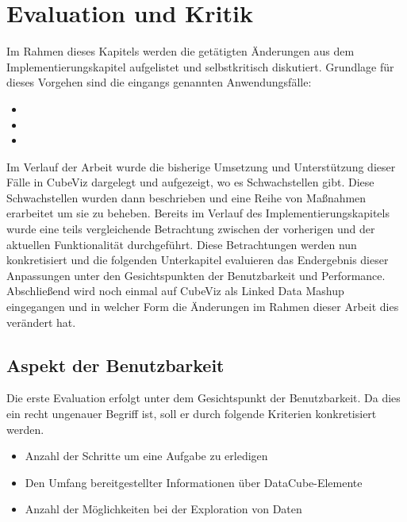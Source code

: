 \documentclass[11pt]{article}
\begin{document}
\section{Evaluation und Kritik}
\label{sec:chapterEvaluation}

Im Rahmen dieses Kapitels werden die getätigten Änderungen aus dem Implementierungskapitel aufgelistet und selbstkritisch diskutiert. Grundlage für dieses Vorgehen sind die eingangs genannten Anwendungsfälle:

\begin{itemize}
    \item {}
    \item {}
    \item {}
\end{itemize}

\noindent
Im Verlauf der Arbeit wurde die bisherige Umsetzung und Unterstützung dieser Fälle in CubeViz dargelegt und aufgezeigt, wo es Schwachstellen gibt. Diese Schwachstellen wurden dann beschrieben und eine Reihe von Maßnahmen erarbeitet um sie zu beheben. Bereits im Verlauf des Implementierungskapitels wurde eine teils vergleichende Betrachtung zwischen der vorherigen und der aktuellen Funktionalität durchgeführt. Diese Betrachtungen werden nun konkretisiert und die folgenden Unterkapitel evaluieren das Endergebnis dieser Anpassungen unter den Gesichtspunkten der Benutzbarkeit und Performance. Abschließend wird noch einmal auf CubeViz als Linked Data Mashup eingegangen und in welcher Form die Änderungen im Rahmen dieser Arbeit dies verändert hat.


%
%
\subsection{Aspekt der Benutzbarkeit}
\label{sec:chapterEvaluationAspectUsability}

Die erste Evaluation erfolgt unter dem Gesichtspunkt der Benutzbarkeit. Da dies ein recht ungenauer Begriff ist, soll er durch folgende Kriterien konkretisiert werden.

\begin{itemize}

    \item Anzahl der Schritte um eine Aufgabe zu erledigen
    
    \item Den Umfang bereitgestellter Informationen über DataCube-Elemente
    
    \item Anzahl der Möglichkeiten bei der Exploration von Daten

\end{itemize}
\end{document}
